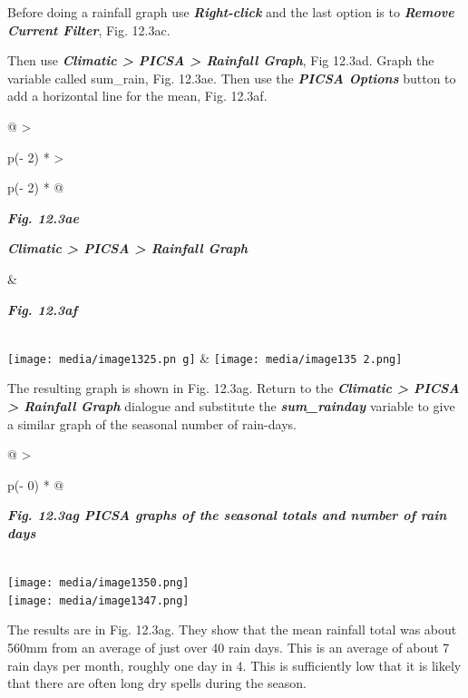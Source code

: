 \documentclass[
  letterpaper,
  DIV=11,
  numbers=noendperiod]{scrreprt}
\begin{document}
Before doing a rainfall graph use \textbf{\emph{Right-click}} and the
last option is to \textbf{\emph{Remove Current Filter}}, Fig. 12.3ac.

Then use \textbf{\emph{Climatic \textgreater{} PICSA \textgreater{}
Rainfall Graph}}, Fig 12.3ad. Graph the variable called sum\_rain, Fig.
12.3ae. Then use the \textbf{\emph{PICSA Options}} button to add a
horizontal line for the mean, Fig. 12.3af.

\begin{longtable}[]{@{}
  >{\raggedright\arraybackslash}p{(\columnwidth - 2\tabcolsep) * }
  >{\raggedright\arraybackslash}p{(\columnwidth - 2\tabcolsep) * }@{}}
\toprule\noalign{}
\begin{minipage}[b]{\linewidth}\raggedright
\textbf{\emph{Fig. 12.3ae}}

\textbf{\emph{Climatic \textgreater{} PICSA \textgreater{} Rainfall
Graph}}
\end{minipage} & \begin{minipage}[b]{\linewidth}\raggedright
\textbf{\emph{Fig. 12.3af}}
\end{minipage} \\
\midrule\noalign{}
\endhead
\bottomrule\noalign{}
\endlastfoot
\texttt{[image: media/image1325.pn g]}
&
\texttt{[image: media/image135 2.png]} \\
\end{longtable}

The resulting graph is shown in Fig. 12.3ag. Return to the
\textbf{\emph{Climatic \textgreater{} PICSA \textgreater{} Rainfall
Graph}} dialogue and substitute the \textbf{\emph{sum\_rainday}}
variable to give a similar graph of the seasonal number of rain-days.

\begin{longtable}[]{@{}
  >{\raggedright\arraybackslash}p{(\columnwidth - 0\tabcolsep) * }@{}}
\toprule\noalign{}
\begin{minipage}[b]{\linewidth}\raggedright
\textbf{\emph{Fig. 12.3ag PICSA graphs of the seasonal totals and number
of rain days}}
\end{minipage} \\
\midrule\noalign{}
\endhead
\bottomrule\noalign{}
\endlastfoot
\texttt{[image: media/image1350.png]} \\
\texttt{[image: media/image1347.png]} \\
\end{longtable}

The results are in Fig. 12.3ag. They show that the mean rainfall total
was about 560mm from an average of just over 40 rain days. This is an
average of about 7 rain days per month, roughly one day in 4. This is
sufficiently low that it is likely that there are often long dry spells
during the season.
\end{document}
